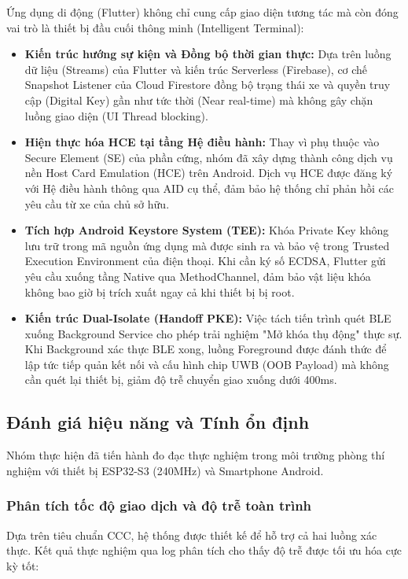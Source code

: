 Ứng dụng di động (Flutter) không chỉ cung cấp giao diện tương tác mà còn đóng vai trò là thiết bị đầu cuối thông minh (Intelligent Terminal):

\begin{itemize}
    \item \textbf{Kiến trúc hướng sự kiện và Đồng bộ thời gian thực:} Dựa trên luồng dữ liệu (Streams) của Flutter và kiến trúc Serverless (Firebase), cơ chế Snapshot Listener của Cloud Firestore đồng bộ trạng thái xe và quyền truy cập (Digital Key) gần như tức thời (Near real-time) mà không gây chặn luồng giao diện (UI Thread blocking).
    
    \item \textbf{Hiện thực hóa HCE tại tầng Hệ điều hành:} Thay vì phụ thuộc vào Secure Element (SE) của phần cứng, nhóm đã xây dựng thành công dịch vụ nền Host Card Emulation (HCE) trên Android. Dịch vụ HCE được đăng ký với Hệ điều hành thông qua AID cụ thể, đảm bảo hệ thống chỉ phản hồi các yêu cầu từ xe của chủ sở hữu.
    
    \item \textbf{Tích hợp Android Keystore System (TEE):} Khóa Private Key không lưu trữ trong mã nguồn ứng dụng mà được sinh ra và bảo vệ trong Trusted Execution Environment của điện thoại. Khi cần ký số ECDSA, Flutter gửi yêu cầu xuống tầng Native qua MethodChannel, đảm bảo vật liệu khóa không bao giờ bị trích xuất ngay cả khi thiết bị bị root.
    
    \item \textbf{Kiến trúc Dual-Isolate (Handoff PKE):} Việc tách tiến trình quét BLE xuống Background Service cho phép trải nghiệm "Mở khóa thụ động" thực sự. Khi Background xác thực BLE xong, luồng Foreground được đánh thức để lập tức tiếp quản kết nối và cấu hình chip UWB (OOB Payload) mà không cần quét lại thiết bị, giảm độ trễ chuyển giao xuống dưới 400ms.
\end{itemize}

\subsection{Đánh giá hiệu năng và Tính ổn định}

Nhóm thực hiện đã tiến hành đo đạc thực nghiệm trong môi trường phòng thí nghiệm với thiết bị ESP32-S3 (240MHz) và Smartphone Android.

\subsubsection{Phân tích tốc độ giao dịch và độ trễ toàn trình}
Dựa trên tiêu chuẩn CCC, hệ thống được thiết kế để hỗ trợ cả hai luồng xác thực. Kết quả thực nghiệm qua log phân tích cho thấy độ trễ được tối ưu hóa cực kỳ tốt:

